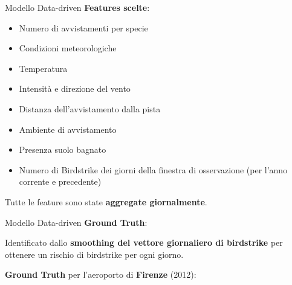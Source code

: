 \documentclass[10pt]{beamer}
\begin{document}
\begin{frame}{Modello Data-driven}
\textbf{Features scelte}:
\begin{itemize}
    \item Numero di avvistamenti per specie
    \item Condizioni meteorologiche
    \item Temperatura
    \item Intensità e direzione del vento
    \item Distanza dell'avvistamento dalla pista
    \item Ambiente di avvistamento
    \item Presenza suolo bagnato
    \item Numero di Birdstrike dei giorni della finestra di osservazione (per l'anno corrente e precedente)
\end{itemize}
Tutte le feature sono state \textbf{aggregate giornalmente}.
\end{frame}


\begin{frame}{Modello Data-driven}
\textbf{Ground Truth}:\par
Identificato dallo \textbf{smoothing del vettore giornaliero di birdstrike} per ottenere un rischio di birdstrike per ogni giorno.\par

\textbf{Ground Truth} per l'aeroporto di \textbf{Firenze} (2012):
\begin{figure}
	\centering
\end{figure}
\end{frame}
\end{document}
